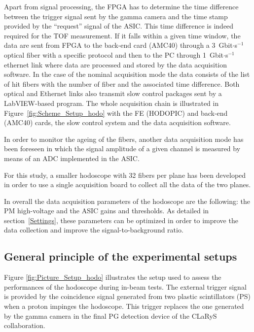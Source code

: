 \documentclass[a4paper,11pt]{article}
\begin{document}
Apart from signal processing, the FPGA has to determine the time difference between the trigger signal sent by the gamma camera and the time stamp provided by the \enquote{request} signal of the ASIC. This time difference is indeed required for the TOF measurement. If it falls within a given time window, the data are sent from FPGA to the back-end card (AMC40) through a 3~Gbit$\cdot$s$^{-1}$ optical fiber with a specific protocol \cite{deng2013, Chen2017, Chen2019} and then to the PC through 1~Gbit$\cdot$s$^{-1}$ ethernet link where data are processed and stored by the data acquisition software. In the case of the nominal acquisition mode the data consists of the list of hit fibers with the number of fiber and the associated time difference. Both optical and Ethernet links also transmit slow control packages sent by a LabVIEW-based program. The whole acquisition chain is illustrated in Figure~\ref{fig:Scheme_Setup_hodo} with the FE (HODOPIC) and back-end (AMC40) cards, the slow control system  and the data acquisition software. 

In order to monitor the ageing of the fibers, another data acquisition mode has been foreseen in which the signal amplitude of a given channel is measured by means of an ADC implemented in the ASIC.

For this study, a smaller hodoscope with 32 fibers per plane has been developed in order to use a single acquisition board to collect all the data of the two planes.

In overall the data acquisition parameters of the hodoscope are the following: the PM high-voltage and the ASIC gains and thresholds. As detailed in section~\ref{Settings}, these parameters can be optimized in order to improve the data collection and improve the signal-to-background ratio.


\subsection{General principle of the experimental setups}
\label{GeneralPrinc}

Figure \ref{fig:Picture_Setup_hodo} illustrates the setup used to assess the performances of the hodoscope during in-beam tests. The external trigger signal is provided by the coincidence signal generated from two plastic scintillators (PS) when a proton impinges the hodoscope. This trigger replaces the one generated by the gamma camera in the final PG detection device of the CLaRyS collaboration.
\end{document}
